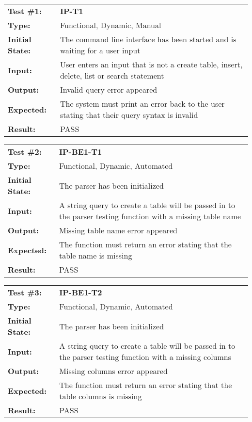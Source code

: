\documentclass[12pt, titlepage]{article}
\begin{document}
\begin{mdframed}[linewidth=1pt]
\begin{tabularx}{\textwidth}{@{}p{3cm}X@{}}
{\bf Test \#1:} & {\bf IP-T1}\\[\baselineskip]
{\bf Type:} & Functional, Dynamic, Manual \\[0.5\baselineskip]
{\bf Initial State:} & The command line interface has been started and is waiting for a user input \\[\baselineskip]
{\bf Input:} & User enters an input that is not a create table, insert, delete, list or search statement \\[\baselineskip]
{\bf Output:} & Invalid query error appeared \\[\baselineskip]
{\bf Expected:} & The system must print an error back to the user stating that their query syntax is invalid \\[\baselineskip]
{\bf Result:} & PASS
\end{tabularx}
\end{mdframed}


\begin{mdframed}[linewidth=1pt]
\begin{tabularx}{\textwidth}{@{}p{3cm}X@{}}
{\bf Test \#2:} & {\bf IP-BE1-T1}\\[\baselineskip]
{\bf Type:} & Functional, Dynamic, Automated \\[0.5\baselineskip]
{\bf Initial State:} & The parser has been initialized \\[\baselineskip]
{\bf Input:} & A string query to create a table will be passed in to the parser testing function with a missing table name \\[\baselineskip]
{\bf Output:} & Missing table name error appeared \\[\baselineskip]
{\bf Expected:} & The function must return an error stating that the table name is missing \\[\baselineskip]
{\bf Result:} & PASS
\end{tabularx}
\end{mdframed}

\begin{mdframed}[linewidth=1pt]
\begin{tabularx}{\textwidth}{@{}p{3cm}X@{}}
{\bf Test \#3:} & {\bf IP-BE1-T2}\\[\baselineskip]
{\bf Type:} & Functional, Dynamic, Automated \\[0.5\baselineskip]
{\bf Initial State:} & The parser has been initialized \\[\baselineskip]
{\bf Input:} & A string query to create a table will be passed in to the parser testing function with a missing columns \\[\baselineskip]
{\bf Output:} & Missing columns error appeared \\[\baselineskip]
{\bf Expected:} & The function must return an error stating that the table columns is missing \\[\baselineskip]
{\bf Result:} & PASS
\end{tabularx}
\end{mdframed}
\end{document}
